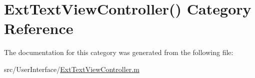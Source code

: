 \hypertarget{category_ext_text_view_controller_07_08}{\section{Ext\-Text\-View\-Controller() Category Reference}
\label{category_ext_text_view_controller_07_08}
}


The documentation for this category was generated from the following file\-:\begin{DoxyCompactItemize}
\item 
src/\-User\-Interface/\hyperlink{_ext_text_view_controller_8m}{Ext\-Text\-View\-Controller.\-m}\end{DoxyCompactItemize}
